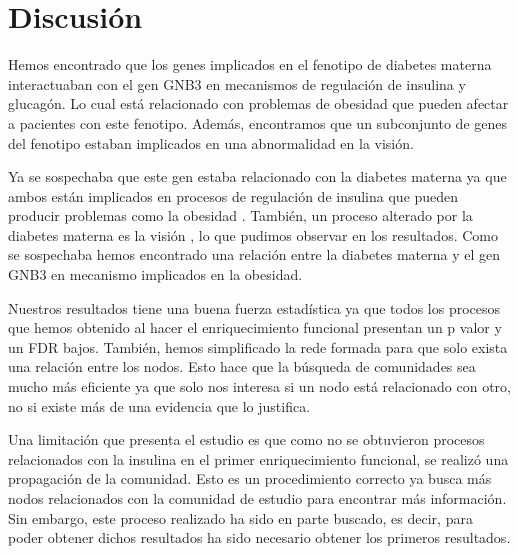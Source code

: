 \section{Discusión}
Hemos encontrado que los genes implicados en el fenotipo de diabetes materna interactuaban con el gen GNB3 en mecanismos de regulación de insulina y glucagón. Lo cual está relacionado con problemas de obesidad que pueden afectar a pacientes con este fenotipo. Además, encontramos que un subconjunto de genes del fenotipo estaban implicados en una abnormalidad en la visión.

Ya se sospechaba que este gen estaba relacionado con la diabetes materna \cite{Feng2019} ya que ambos están implicados en procesos de regulación de insulina \cite{Rodolaki2023, Feng2019} que pueden producir problemas como la obesidad \cite{Shah2011}. También, un proceso alterado por la diabetes materna es la visión \cite{Nelson1986}, lo que pudimos observar en los resultados. Como se sospechaba hemos encontrado una relación entre la diabetes materna y el gen GNB3 en mecanismo implicados en la obesidad.

Nuestros resultados tiene una buena fuerza estadística ya que todos los procesos que hemos obtenido al hacer el enriquecimiento funcional presentan un p valor y un FDR bajos. También, hemos simplificado la rede formada para que solo exista una relación entre los nodos. Esto hace que la búsqueda de comunidades sea mucho más eficiente ya que solo nos interesa si un nodo está relacionado con otro, no si existe más de una evidencia que lo justifica.

Una limitación que presenta el estudio es que como no se obtuvieron procesos relacionados con la insulina en el primer enriquecimiento funcional, se realizó una propagación de la comunidad. Esto es un procedimiento correcto ya busca más nodos relacionados con la comunidad de estudio para encontrar más información. Sin embargo, este proceso realizado ha sido en parte buscado, es decir, para poder obtener dichos resultados ha sido necesario obtener los primeros resultados.

